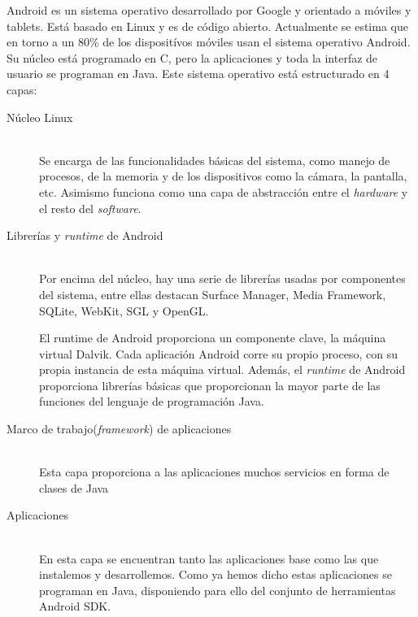 \documentclass[a4paper,openright, 12pt]{book}
\begin{document}
Android es un sistema operativo desarrollado por Google y orientado a móviles y tablets. Está basado en Linux y es de código abierto. Actualmente se estima que en torno a un 80\% de los dispositívos móviles usan el sistema operativo Android.
Su núcleo está programado en C, pero la aplicaciones y toda la interfaz de usuario se programan en Java.
Este sistema operativo está estructurado en 4 capas:
\begin{description}
  \item[Núcleo Linux] \hfill \\
  Se encarga de las funcionalidades básicas del sistema, como manejo de procesos, de la memoria y de los dispositivos como la cámara, la pantalla, etc.
   Asimismo funciona como una capa de abstracción entre el \textit{hardware} y el resto del \textit{software}.
   
  \item[Librerías y \textit{runtime} de Android] \hfill \\
  Por encima del núcleo, hay una serie de librerías usadas por componentes del sistema, entre ellas destacan Surface Manager, Media Framework, SQLite, WebKit, SGL y OpenGL.

  El runtime de Android proporciona un componente clave, la máquina virtual Dalvik. Cada aplicación Android corre su propio proceso, con su propia instancia de esta máquina virtual.
  Además, el \textit{runtime} de Android proporciona librerías básicas que proporcionan la mayor parte de las funciones del lenguaje de programación Java.
  
  \item[Marco de trabajo(\textit{framework}) de aplicaciones] \hfill \\
  Esta capa proporciona a las aplicaciones muchos servicios en forma de clases de Java 
  
   \item[Aplicaciones] \hfill \\
  En esta capa se encuentran tanto las aplicaciones base como las que instalemos y desarrollemos. Como ya hemos dicho estas aplicaciones se programan en Java, disponiendo para ello del conjunto de herramientas Android SDK.
\end{description}
\end{document}
